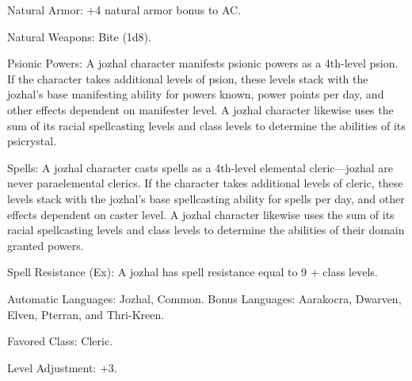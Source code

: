 \begin{itemize*}
    \item Natural Armor: +4 natural armor bonus to AC.
    \item Natural Weapons: Bite (1d8).

    \item Psionic Powers: A jozhal character manifests psionic powers as a 4th-level psion. If the character takes additional levels of psion, these levels stack with the jozhal's base manifesting ability for powers known, power points per day, and other effects dependent on manifester level. A jozhal character likewise uses the sum of its racial spellcasting levels and class levels to determine the abilities of its psicrystal.
    \item Spells: A jozhal character casts spells as a 4th-level elemental cleric---jozhal are never paraelemental clerics. If the character takes additional levels of cleric, these levels stack with the jozhal's base spellcasting ability for spells per day, and other effects dependent on caster level. A jozhal character likewise uses the sum of its racial spellcasting levels and class levels to determine the abilities of their domain granted powers.
    \item Spell Resistance (Ex): A jozhal has spell resistance equal to 9 + class levels.

    \item Automatic Languages: Jozhal, Common. Bonus Languages: Aarakocra, Dwarven, Elven, Pterran, and Thri-Kreen.
    \item Favored Class: Cleric.
    \item Level Adjustment: +3.
\end{itemize*}

